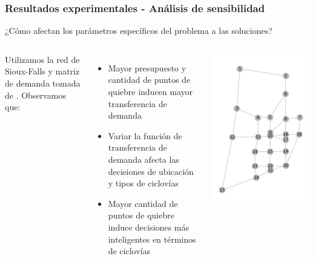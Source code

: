 \documentclass[aspectratio=43, 10pt]{beamer}
\begin{document}
\begin{frame}
    \frametitle{Resultados experimentales - Análisis de sensibilidad}

    ¿Cómo afectan los parámetros específicos del problema a las soluciones?

    \begin{columns}[c]
        Utilizamos la red de Sioux-Falls y matriz de demanda tomada de \textcite{Liu2019}. Observamos que:

        \begin{itemize}
            \item{Mayor presupuesto y cantidad de puntos de quiebre inducen mayor transferencia de demanda}
            \item{Variar la función de transferencia de demanda afecta las decisiones de ubicación y tipos de ciclovías}
            \item{Mayor cantidad de puntos de quiebre induce decisiones más inteligentes en términos de ciclovías}
        \end{itemize}
        \includegraphics[width=\textwidth]{images/sioux_falls.png}
    \end{columns}
\end{frame}
\end{document}
